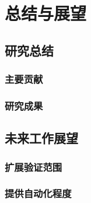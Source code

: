 \chapter{总结与展望}
\section{研究总结}
\subsection{主要贡献}
\subsection{研究成果}
\section{未来工作展望}
\subsection{扩展验证范围}
\subsection{提供自动化程度}